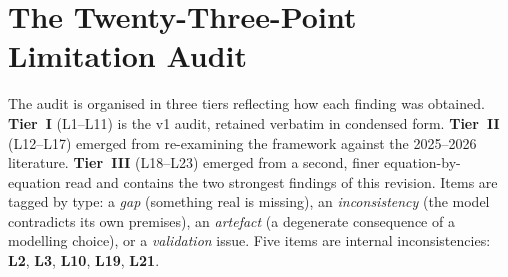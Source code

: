 \documentclass[11pt,a4paper]{article}
\newcommand{\Ltag}[1]{\textcolor{brick}{\textbf{#1}}}
\begin{document}
\section{The Twenty-Three-Point Limitation Audit}
\label{sec:audit}

The audit is organised in three tiers reflecting how each finding was obtained. \textbf{Tier~I} (L1--L11) is the v1 audit, retained verbatim in condensed form. \textbf{Tier~II} (L12--L17) emerged from re-examining the framework against the 2025--2026 literature. \textbf{Tier~III} (L18--L23) emerged from a second, finer equation-by-equation read and contains the two strongest findings of this revision. Items are tagged by type: a \emph{gap} (something real is missing), an \emph{inconsistency} (the model contradicts its own premises), an \emph{artefact} (a degenerate consequence of a modelling choice), or a \emph{validation} issue. Five items are internal inconsistencies: \Ltag{L2}, \Ltag{L3}, \Ltag{L10}, \Ltag{L19}, \Ltag{L21}.
\end{document}
